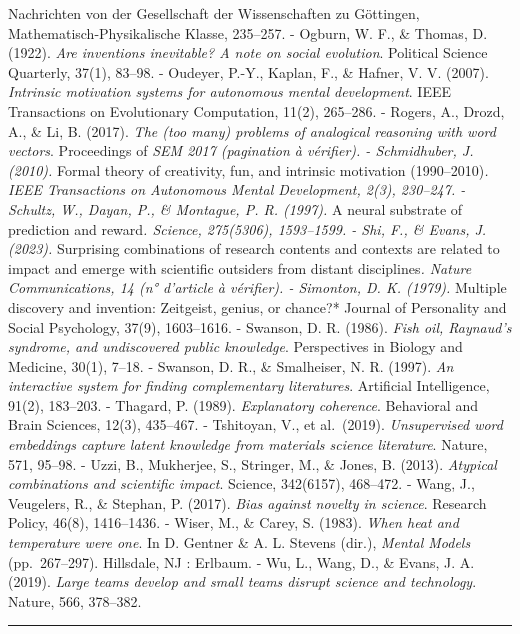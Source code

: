 \documentclass[a4paper,11pt]{article}
\begin{document}
Nachrichten von der Gesellschaft der Wissenschaften zu Göttingen,
Mathematisch-Physikalische Klasse, 235--257. - Ogburn, W. F., \& Thomas,
D. (1922). \emph{Are inventions inevitable? A note on social evolution}.
Political Science Quarterly, 37(1), 83--98. - Oudeyer, P.-Y., Kaplan,
F., \& Hafner, V. V. (2007). \emph{Intrinsic motivation systems for
autonomous mental development}. IEEE Transactions on Evolutionary
Computation, 11(2), 265--286. - Rogers, A., Drozd, A., \& Li, B. (2017).
\emph{The (too many) problems of analogical reasoning with word
vectors}. Proceedings of \emph{SEM 2017 (pagination à vérifier). -
Schmidhuber, J. (2010). }Formal theory of creativity, fun, and intrinsic
motivation (1990--2010)\emph{. IEEE Transactions on Autonomous Mental
Development, 2(3), 230--247. - Schultz, W., Dayan, P., \& Montague, P.
R. (1997). }A neural substrate of prediction and reward\emph{. Science,
275(5306), 1593--1599. - Shi, F., \& Evans, J. (2023). }Surprising
combinations of research contents and contexts are related to impact and
emerge with scientific outsiders from distant disciplines\emph{. Nature
Communications, 14 (n° d'article à vérifier). - Simonton, D. K. (1979).
}Multiple discovery and invention: Zeitgeist, genius, or chance?*
Journal of Personality and Social Psychology, 37(9), 1603--1616. -
Swanson, D. R. (1986). \emph{Fish oil, Raynaud's syndrome, and
undiscovered public knowledge}. Perspectives in Biology and Medicine,
30(1), 7--18. - Swanson, D. R., \& Smalheiser, N. R. (1997). \emph{An
interactive system for finding complementary literatures}. Artificial
Intelligence, 91(2), 183--203. - Thagard, P. (1989). \emph{Explanatory
coherence}. Behavioral and Brain Sciences, 12(3), 435--467. - Tshitoyan,
V., et al.~(2019). \emph{Unsupervised word embeddings capture latent
knowledge from materials science literature}. Nature, 571, 95--98. -
Uzzi, B., Mukherjee, S., Stringer, M., \& Jones, B. (2013).
\emph{Atypical combinations and scientific impact}. Science, 342(6157),
468--472. - Wang, J., Veugelers, R., \& Stephan, P. (2017). \emph{Bias
against novelty in science}. Research Policy, 46(8), 1416--1436. -
Wiser, M., \& Carey, S. (1983). \emph{When heat and temperature were
one}. In D. Gentner \& A. L. Stevens (dir.), \emph{Mental Models}
(pp.~267--297). Hillsdale, NJ : Erlbaum. - Wu, L., Wang, D., \& Evans,
J. A. (2019). \emph{Large teams develop and small teams disrupt science
and technology}. Nature, 566, 378--382.

\begin{center}\rule{0.5\linewidth}{0.5pt}\end{center}
\end{document}
